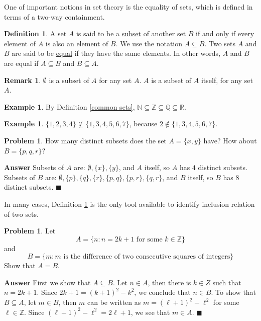 \documentclass[12pt,letterpaper]{book}
\numberwithin{equation}{section}
\theoremstyle{definition}
\newtheorem{defi}[thm]{\textbf{Definition}}
\newtheorem{problem}[thm]{\textbf{Problem}}
\newtheorem{example}[thm]{\textbf{Example}}
\newtheorem{remark}[thm]{\textbf{Remark}}
\newenvironment{answer}{\noindent\textbf{Answer}}{\hfill$\blacksquare$\vspace{0.1in}}
\begin{document}
One of important notions in set theory is the equality of sets, which is defined in terms of a two-way containment.

\begin{defi}\label{equal set defi} A set $A$ is said to be a \underline{subset} of another set $B$ if and only if every element of $A$ is also an element of $B$. We use the notation $A\subseteq B$. Two sets $A$ and $B$ are said to be \underline{equal} if they have the same elements. In other words, $A$ and $B$ are equal if $A\subseteq B$ and $B\subseteq A$.
\end{defi}

\begin{remark} $\emptyset$ is a subset of $A$ for any set $A$. $A$ is a subset of $A$ itself, for any set $A$.
\end{remark}

\begin{example} By Definition \ref{common sets}, $\mathbb{N}\subseteq \mathbb{Z}\subseteq \mathbb{Q} \subseteq \mathbb{R}$.
\end{example}

\begin{example} $\{1,2,3,4\} \nsubseteq \{1,3,4,5,6,7\}$, because $2\notin \{1,3,4,5,6,7\}$.
\end{example}

\begin{problem}\label{num of subsets} How many distinct subsets does the set $A=\{x,y\}$ have? How about $B=\{p,q,r\}$?
\end{problem}

\begin{answer}
Subsets of $A$ are: $\emptyset,\{x\}, \{y\}$, and $A$ itself, so $A$ has $4$ distinct subsets. \\
Subsets of $B$ are: $\emptyset,\{p\}, \{q\}, \{r\}, \{p,q\}, \{p,r\}, \{q,r\}$, and $B$ itself, so $B$ has $8$ distinct subsets.
\end{answer}

In many cases, Definition \ref{equal set defi} is the only tool available to identify inclusion relation of two sets.

\begin{problem} Let $$A=\{n: n=2k+1 \text{ for some } k\in \mathbb{Z}\}$$
and
$$B=\{m: m \text{ is the difference of two consecutive squares of integers}\}$$
Show that $A=B$.
\end{problem}

\begin{answer}
First we show that $A\subseteq B$. Let $n\in A$, then there is $k\in Z$ such that $n=2k+1$. Since $2k+1=(k+1)^2-k^2$, we conclude that $n\in B$. To show that $B\subseteq A$, let $m\in B$, then $m$ can be written as $m=(\ell+1)^2-\ell^2$ for some $\ell\in \mathbb{Z}$. Since $(\ell+1)^2-\ell^2=2\ell+1$, we see that $m\in A$.
\end{answer}
\end{document}
